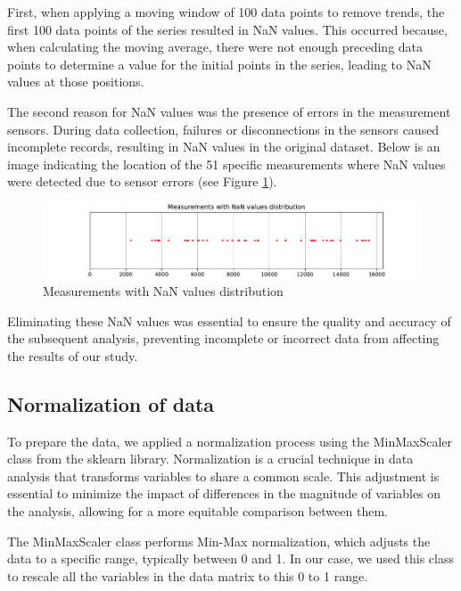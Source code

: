 First, when applying a moving window of 100 data points to remove trends, the first 100 data points of the series resulted in NaN values. This occurred because, when calculating the moving average, there were not enough preceding data points to determine a value for the initial points in the series, leading to NaN values at those positions.

The second reason for NaN values was the presence of errors in the measurement sensors. During data collection, failures or disconnections in the sensors caused incomplete records, resulting in NaN values in the original dataset. Below is an image indicating the location of the 51 specific measurements where NaN values were detected due to sensor errors (see Figure \ref{nan_index_distribution}).

\begin{figure}[htbp]
    \centering
    \includegraphics[width=15 cm]{5_ChapterDesign/figuras/4_IndexNan/nan_index_distribution.pdf}
    \caption{Measurements with NaN values distribution}
    \label{nan_index_distribution}
\end{figure}


Eliminating these NaN values was essential to ensure the quality and accuracy of the subsequent analysis, preventing incomplete or incorrect data from affecting the results of our study.


\subsection{Normalization of data}

To prepare the data, we applied a normalization process using the MinMaxScaler class from the sklearn library. Normalization is a crucial technique in data analysis that transforms variables to share a common scale. This adjustment is essential to minimize the impact of differences in the magnitude of variables on the analysis, allowing for a more equitable comparison between them.

The MinMaxScaler class performs Min-Max normalization, which adjusts the data to a specific range, typically between 0 and 1. In our case, we used this class to rescale all the variables in the data matrix to this 0 to 1 range.

